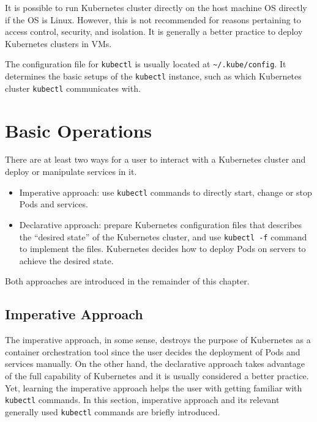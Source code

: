 It is possible to run Kubernetes cluster directly on the host machine OS directly if the OS is Linux. However, this is not recommended for reasons pertaining to access control, security, and isolation. It is generally a better practice to deploy Kubernetes clusters in VMs.

The configuration file for \verb|kubectl| is usually located at \verb|~/.kube/config|. It determines the basic setups of the \verb|kubectl| instance, such as which Kubernetes cluster \verb|kubectl| communicates with.

\section{Basic Operations}

There are at least two ways for a user to interact with a Kubernetes cluster and deploy or manipulate services in it.
\begin{itemize}
  \item Imperative approach: use \verb|kubectl| commands to directly start, change or stop Pods and services.
  \item Declarative approach: prepare Kubernetes configuration files that describes the ``desired state'' of the Kubernetes cluster, and use \verb|kubectl -f| command to implement the files. Kubernetes decides how to deploy Pods on servers to achieve the desired state.
\end{itemize}
Both approaches are introduced in the remainder of this chapter. 

\subsection{Imperative Approach}

The imperative approach, in some sense, destroys the purpose of Kubernetes as a container orchestration tool since the user decides the deployment of Pods and services manually. On the other hand, the declarative approach takes advantage of the full capability of Kubernetes and it is usually considered a better practice. Yet, learning the imperative approach helps the user with getting familiar with \verb|kubectl| commands. In this section, imperative approach and its relevant generally used \verb|kubectl| commands are briefly introduced.

